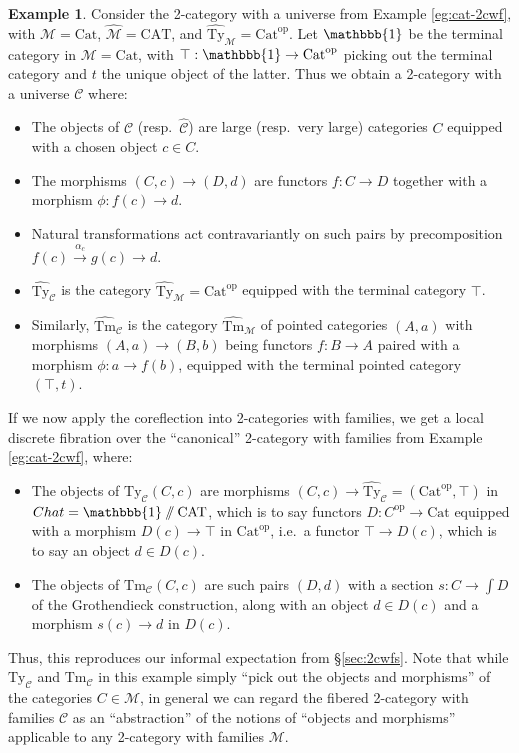 \documentclass[10pt]{article}
\theoremstyle{definition}
\newtheorem{example}{Example}
\newcommand\op{^{\mathrm{op}}}
\newcommand\Cat{\mathrm{Cat}}
\newcommand\CAT{\mathrm{CAT}}
\newcommand\M{\mathcal{M}}
\newcommand\Mhat{\widehat{\mathcal{M}}}
\newcommand\Mtyhat{{\widehat{\mathrm{Ty}}_{\M}}}
\newcommand\Mtmhat{{\widehat{\mathrm{Tm}}_{\M}}}
\newcommand\C{\mathcal{C}}
\newcommand\Chat{{\widehat{\mathcal{C}}}}
\newcommand\Cty{\mathrm{Ty}_{\C}}
\newcommand\Ctm{\mathrm{Tm}_{\C}}
\newcommand\Ctyhat{{\widehat{\mathrm{Ty}}}_{\C}}
\newcommand\Ctmhat{{\widehat{\mathrm{Tm}}}_{\C}}
\newcommand\one{\mathbbb{1}}
\begin{document}
\begin{example}
  Consider the 2-category with a universe from Example \ref{eg:cat-2cwf}, with $\M=\Cat$, $\Mhat = \CAT$, and $\Mtyhat = \Cat\op$.
  Let $\one$ be the terminal category in $\M=\Cat$, with $\top:\one \to \Cat\op$ picking out the terminal category and $t$ the unique object of the latter.
  Thus we obtain a 2-category with a universe $\C$ where:
  \begin{itemize}
  \item The objects of $\C$ (resp.\ $\Chat$) are large (resp.\ very large) categories $C$ equipped with a chosen object $c\in C$.
  \item The morphisms $(C,c) \to (D,d)$ are functors $f:C\to D$ together with a morphism $\phi :f(c) \to d$.
  \item Natural transformations act contravariantly on such pairs by precomposition $f(c) \xrightarrow{\alpha_c} g(c) \to d$.
  \item $\Ctyhat$ is the category $\Mtyhat = \Cat\op$ equipped with the terminal category $\top$.
  \item Similarly, $\Ctmhat$ is the category $\Mtmhat$ of pointed categories $(A,a)$ with morphisms $(A,a) \to (B,b)$ being functors $f:B\to A$ paired with a morphism $\phi : a\to f(b)$, equipped with the terminal pointed category $(\top,t)$.
  \end{itemize}
  If we now apply the coreflection into 2-categories with families, we get a local discrete fibration over the ``canonical'' 2-category with families from Example \ref{eg:cat-2cwf}, where:
  \begin{itemize}
  \item The objects of $\Cty(C,c)$ are morphisms $(C,c) \to \Ctyhat = (\Cat\op,\top)$ in $Chat = \one\sslash\CAT$, which is to say functors $D:C\op\to \Cat$ equipped with a morphism $D(c) \to \top$ in $\Cat\op$, i.e.\ a functor $\top \to D(c)$, which is to say an object $d\in D(c)$.
  \item The objects of $\Ctm(C,c)$ are such pairs $(D,d)$ with a section $s:C\to \int D$ of the Grothendieck construction, along with an object $d\in D(c)$ and a morphism $s(c) \to d$ in $D(c)$.
  \end{itemize}
  Thus, this reproduces our informal expectation from \S\ref{sec:2cwfs}.
  Note that while $\Cty$ and $\Ctm$ in this example simply ``pick out the objects and morphisms'' of the categories $C\in\M$, in general we can regard the fibered 2-category with families $\C$ as an ``abstraction'' of the notions of ``objects and morphisms'' applicable to any 2-category with families $\M$.
\end{example}
\end{document}
